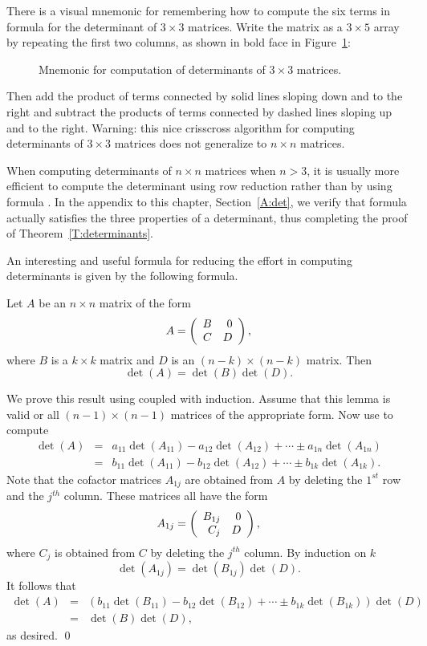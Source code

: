 \documentclass{ximera}
\begin{document}
There is a visual mnemonic for remembering how to compute the six
terms in formula  for the determinant of 
$3\times 3$ matrices.
Write the matrix as a $3\times 5$ array by repeating the first 
two columns, as shown in bold face in Figure~\ref{F:det3}:
\begin{figure}[htb]
           \centerline{%
            }
           \caption{Mnemonic for computation of determinants of 
		$3\times 3$ matrices.}
           \label{F:det3}
\end{figure}
Then add the product of terms connected by solid lines sloping down and 
to the right and subtract the products of terms connected by dashed lines 
sloping up and to the right.  Warning: this nice crisscross algorithm 
for computing determinants of $3\times 3$ matrices does not generalize 
to $n\times n$ matrices.
 
When computing determinants of $n\times n$ matrices when $n>3$,
it is usually more efficient to compute the determinant using row
reduction rather than by using formula .  In the
appendix to this chapter, Section~\ref{A:det}, we verify that formula 
 actually satisfies the three properties of a determinant, 
thus completing the proof of Theorem~\ref{T:determinants}.  

An interesting and useful formula for reducing the effort in 
computing determinants is given by the following formula.
\begin{lemma} \label{L:detblockdiag}
Let $A$ be an $n\times n$ matrix of the form
\[
A=\left(\begin{array}{rr} B & 0\\ C &D\end{array}\right),
\]
where $B$ is a $k\times k$ matrix and $D$ is an $(n-k)\times(n-k)$
matrix.  Then
\[
\det(A)=\det(B)\det(D).
\]
\end{lemma}

\proof We prove this result using  coupled with 
induction. Assume that this lemma is valid or all $(n-1)\times
(n-1)$ matrices of the appropriate form.  Now use
 to compute
\begin{eqnarray*}
\det(A) & = & a_{11}\det(A_{11})-a_{12}\det(A_{12}) + \cdots\pm
a_{1n}\det(A_{1n}) \\
& = &  b_{11}\det(A_{11})-b_{12}\det(A_{12}) + \cdots\pm
b_{1k}\det(A_{1k}).
\end{eqnarray*}
Note that the cofactor matrices $A_{1j}$ are obtained from $A$
by deleting the $1^{st}$ row and the $j^{th}$ column.  These
matrices all have the form
\[
A_{1j} = \left(\begin{array}{rr} B_{1j} & 0\\ C_j &D\end{array}\right),
\]
where $C_j$ is obtained from $C$ by deleting the $j^{th}$
column. By induction on $k$
\[
\det(A_{1j}) = \det(B_{1j})\det(D).
\]
It follows that 
\begin{eqnarray*}
\det(A) & = & \left(b_{11}\det(B_{11})-b_{12}\det(B_{12}) + \cdots\pm
b_{1k}\det(B_{1k})\right)\det(D) \\
& = & \det(B)\det(D),
\end{eqnarray*}
as desired.  \qed
\end{document}
